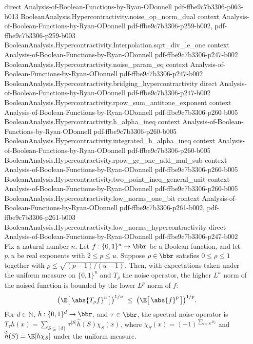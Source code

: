 \begin{theorem}
  {direct}
  {Analysis-of-Boolean-Functions-by-Ryan-ODonnell}
  {pdf-ffbe9c7b3306-p063-b013}
\proofstep
  {BooleanAnalysis.Hypercontractivity.noise_op_norm_dual}
  {context}
  {Analysis-of-Boolean-Functions-by-Ryan-ODonnell}
  {pdf-ffbe9c7b3306-p259-b002,
    pdf-ffbe9c7b3306-p259-b003}
\proofstep
  {BooleanAnalysis.Hypercontractivity.Interpolation.sqrt_div_le_one}
  {context}
  {Analysis-of-Boolean-Functions-by-Ryan-ODonnell}
  {pdf-ffbe9c7b3306-p247-b002}
\proofstep
  {BooleanAnalysis.Hypercontractivity.noise_param_eq}
  {context}
  {Analysis-of-Boolean-Functions-by-Ryan-ODonnell}
  {pdf-ffbe9c7b3306-p247-b002}
\proofstep
  {BooleanAnalysis.Hypercontractivity.bridging_hypercontractivity}
  {direct}
  {Analysis-of-Boolean-Functions-by-Ryan-ODonnell}
  {pdf-ffbe9c7b3306-p247-b002}
\proofstep
  {BooleanAnalysis.Hypercontractivity.rpow_sum_antitone_exponent}
  {context}
  {Analysis-of-Boolean-Functions-by-Ryan-ODonnell}
  {pdf-ffbe9c7b3306-p260-b005}
\proofstep
  {BooleanAnalysis.Hypercontractivity.h_alpha_ineq}
  {context}
  {Analysis-of-Boolean-Functions-by-Ryan-ODonnell}
  {pdf-ffbe9c7b3306-p260-b005}
\proofstep
  {BooleanAnalysis.Hypercontractivity.integrated_h_alpha_ineq}
  {context}
  {Analysis-of-Boolean-Functions-by-Ryan-ODonnell}
  {pdf-ffbe9c7b3306-p260-b005}
\proofstep
  {BooleanAnalysis.Hypercontractivity.rpow_ge_one_add_mul_sub}
  {context}
  {Analysis-of-Boolean-Functions-by-Ryan-ODonnell}
  {pdf-ffbe9c7b3306-p260-b005}
\proofstep
  {BooleanAnalysis.Hypercontractivity.two_point_ineq_general_unit}
  {context}
  {Analysis-of-Boolean-Functions-by-Ryan-ODonnell}
  {pdf-ffbe9c7b3306-p260-b005}
\proofstep
  {BooleanAnalysis.Hypercontractivity.low_norms_one_bit}
  {context}
  {Analysis-of-Boolean-Functions-by-Ryan-ODonnell}
  {pdf-ffbe9c7b3306-p261-b002,
    pdf-ffbe9c7b3306-p261-b003}
\proofstep
  {BooleanAnalysis.Hypercontractivity.low_norms_hypercontractivity}
  {direct}
  {Analysis-of-Boolean-Functions-by-Ryan-ODonnell}
  {pdf-ffbe9c7b3306-p247-b002}
\label{BooleanAnalysis.Hypercontractivity.high_norms_hypercontractivity}
Fix a natural number $n$. Let $f : \{0,1\}^n \to \bbr$ be a Boolean function, and let
$p, u$ be real exponents
with $2 \le p \le u$. Suppose $\rho \in \bbr$ satisfies $0 \le \rho \le 1$ together with
$\rho \le \sqrt{(p-1)/(u-1)}$. Then, with expectations taken under the uniform measure
on $\{0,1\}^n$ and $T_\rho$ the noise operator, the higher $L^u$ norm of the noised
function is bounded by the lower $L^p$ norm of $f$:
\[
\bigl(\E\bigl[\,\abs{T_\rho f}^u\,\bigr]\bigr)^{1/u} \;\le\;
\bigl(\E\bigl[\,\abs{f}^p\,\bigr]\bigr)^{1/p}.
\] For $d\in\mathbb N$, $h:\{0,1\}^d\to\bbr$, and $\tau\in\bbr$, the spectral noise
operator is $T_\tau h(x)=\sum_{S\subseteq[d]}\tau^{|S|}\widehat h(S)\chi_S(x)$, where
$\chi_S(x)=(-1)^{\sum_{i\in S}x_i}$ and $\widehat h(S)=\E[h\chi_S]$ under the uniform
measure.
\end{theorem}


